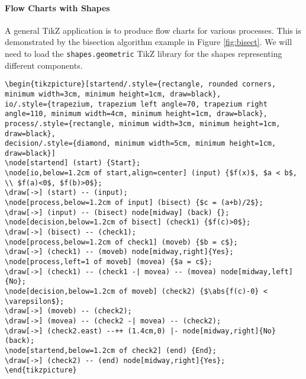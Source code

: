\paragraph{Flow Charts with Shapes}
A general TikZ application is to produce flow charts for various processes. This is demonstrated by the bisection algorithm example in Figure \ref{fig:bisect}. We will need to load the \texttt{shapes.geometric} TikZ library for the shapes representing different components.
\begin{lstlisting}
\begin{tikzpicture}[startend/.style={rectangle, rounded corners, minimum width=3cm, minimum height=1cm, draw=black},
io/.style={trapezium, trapezium left angle=70, trapezium right angle=110, minimum width=4cm, minimum height=1cm, draw=black},
process/.style={rectangle, minimum width=3cm, minimum height=1cm, draw=black},
decision/.style={diamond, minimum width=5cm, minimum height=1cm, draw=black}]
\node[startend] (start) {Start};
\node[io,below=1.2cm of start,align=center] (input) {$f(x)$, $a < b$, \\ $f(a)<0$, $f(b)>0$};
\draw[->] (start) -- (input);
\node[process,below=1.2cm of input] (bisect) {$c = (a+b)/2$};
\draw[->] (input) -- (bisect) node[midway] (back) {};
\node[decision,below=1.2cm of bisect] (check1) {$f(c)>0$};
\draw[->] (bisect) -- (check1);
\node[process,below=1.2cm of check1] (moveb) {$b = c$};
\draw[->] (check1) -- (moveb) node[midway,right]{Yes};
\node[process,left=1 of moveb] (movea) {$a = c$};
\draw[->] (check1) -- (check1 -| movea) -- (movea) node[midway,left]{No};
\node[decision,below=1.2cm of moveb] (check2) {$\abs{f(c)-0} < \varepsilon$};
\draw[->] (moveb) -- (check2);
\draw[->] (movea) -- (check2 -| movea) -- (check2);
\draw[->] (check2.east) --++ (1.4cm,0) |- node[midway,right]{No} (back);
\node[startend,below=1.2cm of check2] (end) {End};
\draw[->] (check2) -- (end) node[midway,right]{Yes};
\end{tikzpicture}    
\end{lstlisting}
